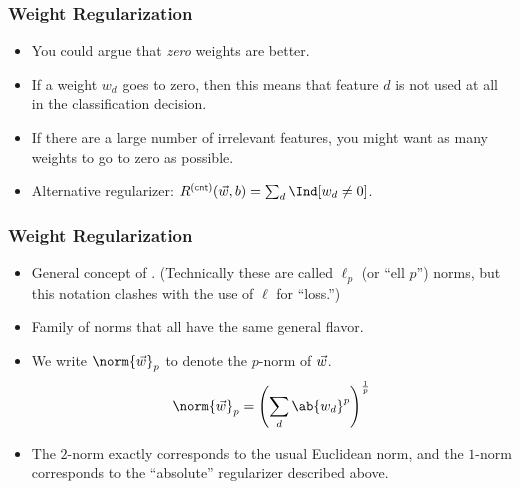 \documentclass[trans,aspectratio=169]{beamer}
\begin{document}
\begin{frame}
  \frametitle{Weight Regularization}
\begin{itemize}
\item
You could argue that
\emph{zero} weights are better.  
\item If a weight $w_d$ goes to zero, then
this means that feature $d$ is not used at all in the classification
decision.
\item   If there are a large number of irrelevant features, you
might want as many weights to go to zero as possible.  
\item Alternative regularizer: $R\xth{cnt}(\vw,b) = \sum_d \Ind[w_d \neq
0]$.
\end{itemize}
\end{frame}

\begin{frame}
  \frametitle{Weight Regularization}
\begin{itemize}
\item
General concept of
.  (Technically these are called $\ell_p$ (or ``ell
$p$'') norms, but this notation clashes with the use of $\ell$ for
``loss.'') 
\item Family of norms that all have the same general
flavor. 
\item We write $\norm{\vw}_p$ to denote the $p$-norm of ${\vec w}$.
%
\begin{equation} \label{eq:loss:l}
  \norm{\vw}_p = \left( \sum_d \ab{w_d}^p \right)^{\frac 1 p}
\end{equation}
%
\item The $2$-norm exactly corresponds to the usual
Euclidean norm, and  the $1$-norm corresponds to the ``absolute''
regularizer described above.
\end{itemize}
\end{frame}
\end{document}
